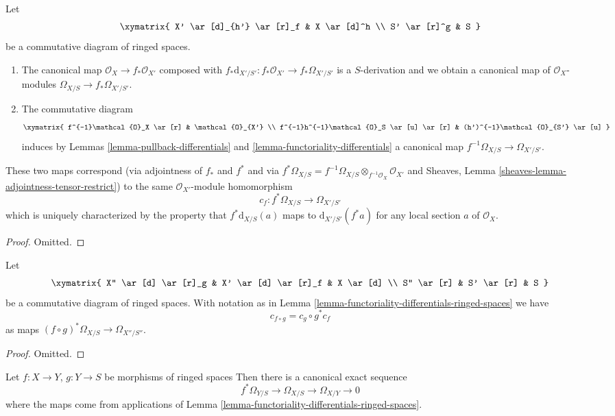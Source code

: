 \begin{lemma}
\label{lemma-functoriality-differentials-ringed-spaces}
Let
$$
\xymatrix{
X' \ar[d]_{h'} \ar[r]_f & X \ar[d]^h \\
S' \ar[r]^g & S
}
$$
be a commutative diagram of ringed spaces.
\begin{enumerate}
\item The canonical map $\mathcal{O}_X \to f_*\mathcal{O}_{X'}$ composed with
$f_*\text{d}_{X'/S'} : f_*\mathcal{O}_{X'} \to f_*\Omega_{X'/S'}$ is a
$S$-derivation and we obtain a canonical map of $\mathcal{O}_X$-modules
$\Omega_{X/S} \to f_*\Omega_{X'/S'}$.
\item The commutative diagram
$$
\xymatrix{
f^{-1}\mathcal{O}_X \ar[r] & \mathcal{O}_{X'} \\
f^{-1}h^{-1}\mathcal{O}_S \ar[u] \ar[r] & (h')^{-1}\mathcal{O}_{S'} \ar[u]
}
$$
induces by Lemmas \ref{lemma-pullback-differentials} and
\ref{lemma-functoriality-differentials}
a canonical map $f^{-1}\Omega_{X/S} \to \Omega_{X'/S'}$.
\end{enumerate}
These two maps correspond (via adjointness of $f_*$ and $f^*$ and
via $f^*\Omega_{X/S} =
f^{-1}\Omega_{X/S} \otimes_{f^{-1}\mathcal{O}_X} \mathcal{O}_{X'}$ and
Sheaves, Lemma \ref{sheaves-lemma-adjointness-tensor-restrict})
to the same $\mathcal{O}_{X'}$-module homomorphism
$$
c_f : f^*\Omega_{X/S} \longrightarrow \Omega_{X'/S'}
$$
which is uniquely characterized by the property that
$f^*\text{d}_{X/S}(a)$ maps to $\text{d}_{X'/S'}(f^*a)$
for any local section $a$ of $\mathcal{O}_X$.
\end{lemma}

\begin{proof}
Omitted.
\end{proof}

\begin{lemma}
\label{lemma-check-functoriality-differentials}
Let
$$
\xymatrix{
X'' \ar[d] \ar[r]_g & X' \ar[d] \ar[r]_f & X \ar[d] \\
S'' \ar[r] & S' \ar[r] & S
}
$$
be a commutative diagram of ringed spaces. With notation as in
Lemma \ref{lemma-functoriality-differentials-ringed-spaces} we have
$$
c_{f \circ g} = c_g \circ g^* c_f
$$
as maps $(f \circ g)^*\Omega_{X/S} \to \Omega_{X''/S''}$.
\end{lemma}

\begin{proof}
Omitted.
\end{proof}

\begin{lemma}
\label{lemma-triangle-differentials}
Let $f : X \to Y$, $g : Y \to S$ be morphisms of ringed spaces
Then there is a canonical exact sequence
$$
f^*\Omega_{Y/S} \to \Omega_{X/S} \to \Omega_{X/Y} \to 0
$$
where the maps come from applications of
Lemma \ref{lemma-functoriality-differentials-ringed-spaces}.
\end{lemma}

